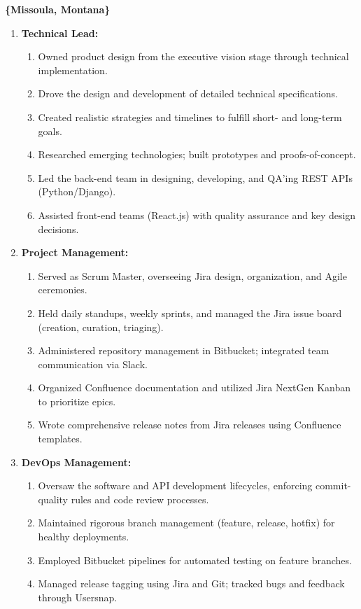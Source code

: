 \documentclass[oneside]{article}%
\begin{document}
\begin{enumerate}[]
		\textbf{\{Missoula, Montana\}}
		\begin{enumerate}[]
			\item \textbf{Technical Lead:}
				\begin{enumerate}[-]
					\item Owned product design from the executive vision stage through technical implementation.
					\item Drove the design and development of detailed technical specifications.
					\item Created realistic strategies and timelines to fulfill short- and long-term goals.
					\item Researched emerging technologies; built prototypes and proofs-of-concept.
					\item Led the back-end team in designing, developing, and QA’ing REST APIs (Python/Django).
					\item Assisted front-end teams (React.js) with quality assurance and key design decisions.
				\end{enumerate}
			\item \textbf{Project Management:}
				\begin{enumerate}[-]
					\item Served as Scrum Master, overseeing Jira design, organization, and Agile ceremonies.
					\item Held daily standups, weekly sprints, and managed the Jira issue board (creation, curation, triaging).
					\item Administered repository management in Bitbucket; integrated team communication via Slack.
      					\item Organized Confluence documentation and utilized Jira NextGen Kanban to prioritize epics.
      					\item Wrote comprehensive release notes from Jira releases using Confluence templates.
				\end{enumerate}
			\item \textbf{DevOps Management:}
				\begin{enumerate}[-]
					\item Oversaw the software and API development lifecycles, enforcing commit-quality rules and code review processes.
					\item Maintained rigorous branch management (feature, release, hotfix) for healthy deployments.
					\item Employed Bitbucket pipelines for automated testing on feature branches.
					\item Managed release tagging using Jira and Git; tracked bugs and feedback through Usersnap.

\end{enumerate}
\end{enumerate}
\end{enumerate}
\end{document}

